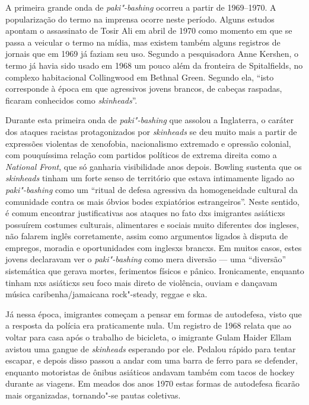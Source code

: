 A primeira grande onda de \emph{paki"-bashing} ocorreu a partir de 1969--1970. A popularização do termo na imprensa ocorre neste período. Alguns estudos apontam o assassinato de Tosir Ali em abril de 1970 como momento em que se passa a veicular o termo na mídia, mas existem também alguns registros de jornais que em 1969 já faziam seu uso. Segundo a pesquisadora Anne Kershen, o termo já havia sido usado em 1968 um pouco além da fronteira de Spitalfields, no complexo habitacional Collingwood em Bethnal Green. Segundo ela, ``isto corresponde à época em que agressivos jovens brancos, de cabeças raspadas, ficaram conhecidos como \emph{skinheads}''.

Durante esta primeira onda de \emph{paki"-bashing} que assolou a Inglaterra, o caráter dos ataques racistas protagonizados por \emph{skinheads} se deu muito mais a partir de expressões violentas de xenofobia, nacionalismo extremado e opressão colonial, com pouquíssima relação com partidos políticos de extrema direita como a \emph{National Front}, que só ganharia visibilidade anos depois. Bowling sustenta que os \emph{skinheads} tinham um forte senso de território que estava intimamente ligado ao \emph{paki"-bashing} como um ``ritual de defesa agressiva da homogeneidade cultural da comunidade contra os mais óbvios bodes expiatórios estrangeiros''. Neste sentido, é comum encontrar justificativas aos ataques no fato dxs imigrantes asiáticxs possuírem costumes culturais, alimentares e sociais muito diferentes dos ingleses, não falarem inglês corretamente, assim como argumentos ligados à disputa de empregos, moradia e oportunidades com inglesxs brancxs. Em muitos casos, estes jovens declaravam ver o \emph{paki"-bashing} como mera diversão --- uma ``diversão'' sistemática que gerava mortes, ferimentos físicos e pânico. Ironicamente, enquanto tinham nxs asiáticxs seu foco mais direto de violência, ouviam e dançavam música caribenha/jamaicana rock"-steady, reggae e ska.

Já nessa época, imigrantes começam a pensar em formas de autodefesa, visto que a resposta da polícia era praticamente nula. Um registro de 1968 relata que ao voltar para casa após o trabalho de bicicleta, o imigrante Gulam Haider Ellam avistou uma gangue de \emph{skinheads} esperando por ele. Pedalou rápido para tentar escapar, e depois disso passou a andar com uma barra de ferro para se defender, enquanto motoristas de ônibus asiáticos andavam também com tacos de hockey durante as viagens. Em meados dos anos 1970 estas formas de autodefesa ficarão mais organizadas, tornando"-se pautas coletivas.


